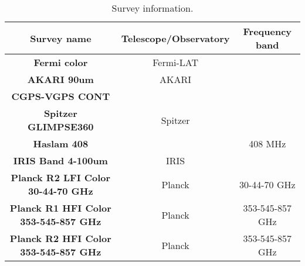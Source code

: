 
\begin{table*}[h]

\caption{Survey information.}
\label{tab:a}
\begin{tabular}{ || c|cc ||}
\hline

\textbf{Survey name} & \textbf{Telescope/Observatory} & \textbf{Frequency band}\\ \hline
\textbf{Fermi color} & Fermi-LAT & \\
\textbf{AKARI 90um} & AKARI & \\
\textbf{CGPS-VGPS CONT} &  & \\
\textbf{Spitzer GLIMPSE360} & Spitzer & \\
\textbf{Haslam 408} &  & 408 MHz\\
\textbf{IRIS Band 4-100um} & IRIS & \\
\textbf{Planck R2 LFI Color 30-44-70 GHz} & Planck & 30-44-70 GHz\\
\textbf{Planck R1 HFI Color 353-545-857 GHz} & Planck & 353-545-857 GHz\\
\textbf{Planck R2 HFI Color 353-545-857 GHz} & Planck & 353-545-857 GHz\\
\hline
\end{tabular}

\end{table*}
